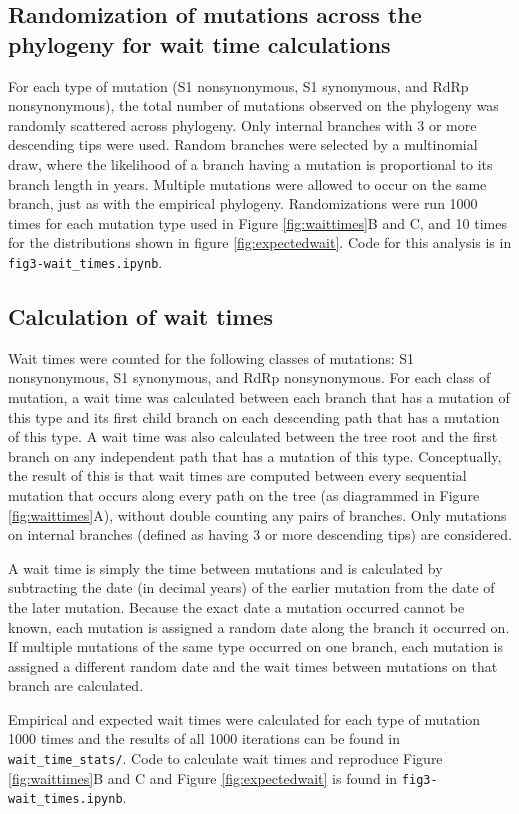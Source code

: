 \documentclass[11pt,oneside,letterpaper]{article}
\begin{document}
\subsection*{Randomization of mutations across the phylogeny for wait time calculations}
For each type of mutation (S1 nonsynonymous, S1 synonymous, and RdRp nonsynonymous), the total number of mutations observed on the phylogeny was randomly scattered across phylogeny.
Only internal branches with 3 or more descending tips were used.
Random branches were selected by a multinomial draw, where the likelihood of a branch having a mutation is proportional to its branch length in years.
Multiple mutations were allowed to occur on the same branch, just as with the empirical phylogeny.
Randomizations were run 1000 times for each mutation type used in Figure \ref{fig:waittimes}B and C, and 10 times for the distributions shown in figure \ref{fig:expectedwait}.
Code for this analysis is in \texttt{fig3-wait\_times.ipynb}.

\subsection*{Calculation of wait times}
Wait times were counted for the following classes of mutations: S1 nonsynonymous, S1 synonymous, and RdRp nonsynonymous.
For each class of mutation, a wait time was calculated between each branch that has a mutation of this type and its first child branch on each descending path that has a mutation of this type.
A wait time was also calculated between the tree root and the first branch on any independent path that has a mutation of this type.
Conceptually, the result of this is that wait times are computed between every sequential mutation that occurs along every path on the tree (as diagrammed in Figure \ref{fig:waittimes}A), without double counting any pairs of branches.
Only mutations on internal branches (defined as having 3 or more descending tips) are considered.

A wait time is simply the time between mutations and is calculated by subtracting the date (in decimal years) of the earlier mutation from the date of the later mutation.
Because the exact date a mutation occurred cannot be known, each mutation is assigned a random date along the branch it occurred on.
If multiple mutations of the same type occurred on one branch, each mutation is assigned a different random date and the wait times between mutations on that branch are calculated.

Empirical and expected wait times were calculated for each type of mutation 1000 times and the results of all 1000 iterations can be found in \texttt{wait\_time\_stats/}.
Code to calculate wait times and reproduce Figure \ref{fig:waittimes}B and C and Figure \ref{fig:expectedwait} is found in \texttt{fig3-wait\_times.ipynb}.
\end{document}
